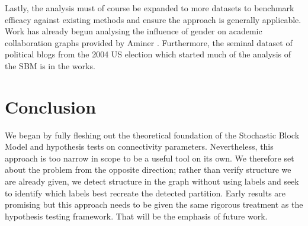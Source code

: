\documentclass[11pt]{article}
\begin{document}
\begin{multicols*}{2}
Lastly, the analysis must of course be expanded to more datasets to benchmark efficacy against existing methods and ensure the approach is generally applicable. Work has already begun analysing the influence of gender on academic collaboration graphs provided by Aminer \cite{aminer}. Furthermore, the seminal dataset of political blogs from the 2004 US election \cite{polblogs} which started much of the analysis of the SBM is in the works.

\section{Conclusion}

We began by fully fleshing out the theoretical foundation of the Stochastic Block Model and hypothesis tests on connectivity parameters. Nevertheless, this approach is too narrow in scope to be a useful tool on its own. We therefore set about the problem from the opposite direction; rather than verify structure we are already given, we detect structure in the graph without using labels and seek to identify which labels best recreate the detected partition. Early results are promising but this approach needs to be given the same rigorous treatment as the hypothesis testing framework. That will be the emphasis of future work.

\printbibliography

\end{multicols*}
\end{document}
